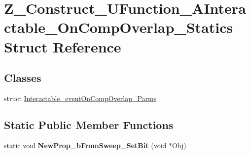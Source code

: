 \hypertarget{struct_z___construct___u_function___a_interactable___on_comp_overlap___statics}{}\section{Z\+\_\+\+Construct\+\_\+\+U\+Function\+\_\+\+A\+Interactable\+\_\+\+On\+Comp\+Overlap\+\_\+\+Statics Struct Reference}
\label{struct_z___construct___u_function___a_interactable___on_comp_overlap___statics}
\subsection*{Classes}
\begin{DoxyCompactItemize}
\item 
struct \mbox{\hyperlink{struct_z___construct___u_function___a_interactable___on_comp_overlap___statics_1_1_interactable__event_on_comp_overlap___parms}{Interactable\+\_\+event\+On\+Comp\+Overlap\+\_\+\+Parms}}
\end{DoxyCompactItemize}
\subsection*{Static Public Member Functions}
\begin{DoxyCompactItemize}
\item 
\mbox{\label{struct_z___construct___u_function___a_interactable___on_comp_overlap___statics_a3784dced8bcb567f0bde9a2530665d08}} 
static void {\bfseries New\+Prop\+\_\+b\+From\+Sweep\+\_\+\+Set\+Bit} (void $\ast$Obj)
\end{DoxyCompactItemize}
